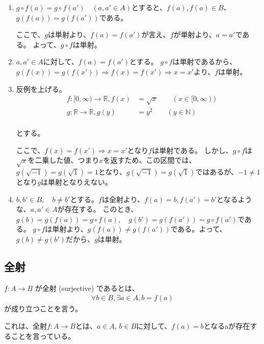 \documentclass[dvipdfmx,autodetect-engine]{jsarticle}
\begin{document}
\begin{enumerate}
	\item $g \circ f(a) = g \circ f(a') \quad (a, a' \in A)$とすると、$f(a), f(a) \in B$、$g(f(a))　= g(f(a'))$である。
	
	ここで、$g$は単射より、$f(a) = f(a')$が言え、$f$が単射より、$a = a'$である。
	よって、$g \circ f$は単射。
	
	\item $a,a' \in A$に対して、$f(a) = f(a')$とする。
	$g \circ f$は単射であるから、$g(f(x)) = g(f(x')) \Rightarrow f(x) = f(x') \Rightarrow x = x'$より、$f$は単射。

    \item 反例を上げる。
    \begin{eqnarray*}
    &f:[0,∞) \to \mathbb{R}, f(x) &= \sqrt{x} \quad \quad (x \in [0,∞)) \\
    &g:\mathbb{R} \to \mathbb{R}, g(y) &= y^2  \quad \quad (y \in \mathbb{N}) \\
    \end{eqnarray*}
    
    とする。
    
    ここで、$f(x) = f(x') \Rightarrow x = x'$となり$f$は単射である。
    しかし、$g \circ f$は$\sqrt{x}$を二乗した値、つまり$x$を返すため、この区間では、$g(\sqrt{-1}) = g(\sqrt{1}) = 1$となり、$g(\sqrt{-1}) = g(\sqrt{1})$ではあるが、$-1 \neq 1$となり$g$は単射となりえない。
    
    \item $b, b' \in B, \quad b \neq b'$とする。$f$は全射より、$f(a) = b, f(a') = b'$となるような、$a, a' \in A$が存在する。
    このとき、$g(b) = g(f(a)) = g \circ f(a), \quad g(b') = g(f(a')) = g \circ f(a')$である。
    $g \circ f$は単射より、$g(f(a)) \neq g(f(a'))$である。よって、$g(b) \neq g(b')$だから、$g$は単射。
	
\end{enumerate}

\subsection{全射}

$f: A \to B$ が全射 (surjective) であるとは、
\begin{eqnarray*}
\forall b \in B, \exists a \in A, b = f(a)
\end{eqnarray*}
が成り立つことを言う。

これは、全射$f: A \to B$とは、$a \in A$, $b \in B$に対して、$f(a) = b$となるaが存在することを言っている。
\end{document}

